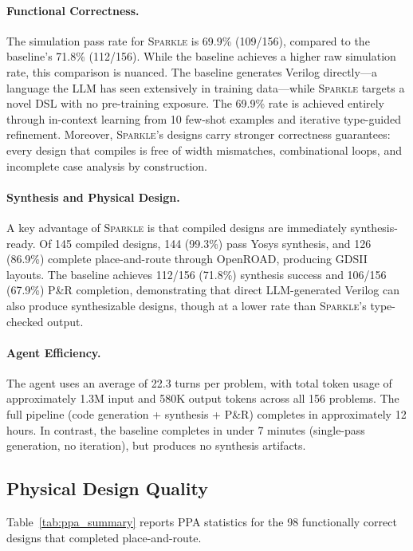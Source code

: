 \paragraph{Functional Correctness.}
The simulation pass rate for \textsc{Sparkle} is 69.9\% (109/156), compared to the baseline's 71.8\% (112/156). While the baseline achieves a higher raw simulation rate, this comparison is nuanced. The baseline generates Verilog directly---a language the LLM has seen extensively in training data---while \textsc{Sparkle} targets a novel DSL with no pre-training exposure. The 69.9\% rate is achieved entirely through in-context learning from 10 few-shot examples and iterative type-guided refinement. Moreover, \textsc{Sparkle}'s designs carry stronger correctness guarantees: every design that compiles is free of width mismatches, combinational loops, and incomplete case analysis by construction.

\paragraph{Synthesis and Physical Design.}
A key advantage of \textsc{Sparkle} is that compiled designs are immediately synthesis-ready. Of 145 compiled designs, 144 (99.3\%) pass Yosys synthesis, and 126 (86.9\%) complete place-and-route through OpenROAD, producing GDSII layouts. The baseline achieves 112/156 (71.8\%) synthesis success and 106/156 (67.9\%) P\&R completion, demonstrating that direct LLM-generated Verilog can also produce synthesizable designs, though at a lower rate than \textsc{Sparkle}'s type-checked output.

\paragraph{Agent Efficiency.}
The agent uses an average of 22.3 turns per problem, with total token usage of approximately 1.3M input and 580K output tokens across all 156 problems. The full pipeline (code generation + synthesis + P\&R) completes in approximately 12 hours. In contrast, the baseline completes in under 7 minutes (single-pass generation, no iteration), but produces no synthesis artifacts.

\subsection{Physical Design Quality}
\label{sec:ppa_results}

Table~\ref{tab:ppa_summary} reports PPA statistics for the 98 functionally correct designs that completed place-and-route.


